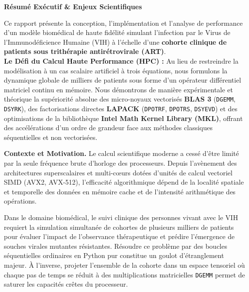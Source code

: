 \documentclass[11pt,a4paper]{report}
\theoremstyle{plain}
\theoremstyle{definition}
\theoremstyle{remark}
\begin{document}
\begin{tcolorbox}[colback=navyblue!90!black,colframe=navyblue!90!black,arc=2pt,coltext=white,boxrule=0pt]
\textbf{\large Résumé Exécutif \& Enjeux Scientifiques}
\end{tcolorbox}
\vspace{-0.3cm}
\begin{tcolorbox}[colback=blue!5!white,colframe=navyblue!80!black,arc=2pt,boxrule=0.8pt]
Ce rapport présente la conception, l'implémentation et l'analyse de performance d'un modèle biomédical de haute fidélité simulant l'infection par le Virus de l'Immunodéficience Humaine (VIH) à l'échelle d'une \textbf{cohorte clinique de patients sous trithérapie antirétrovirale (ART)}.\\
\textbf{Le Défi du Calcul Haute Performance (HPC) :} Au lieu de restreindre la modélisation à un cas scalaire artificiel à trois équations, nous formulons la dynamique globale de milliers de patients sous forme d'un opérateur différentiel matriciel continu en mémoire. Nous démontrons de manière expérimentale et théorique la supériorité absolue des micro-noyaux vectorisés \textbf{BLAS 3} (\texttt{DGEMM}, \texttt{DSYRK}), des factorisations directes \textbf{LAPACK} (\texttt{DPOTRF}, \texttt{DPOTRS}, \texttt{DSYEVD}) et des optimisations de la bibliothèque \textbf{Intel Math Kernel Library (MKL)}, offrant des accélérations d'un ordre de grandeur face aux méthodes classiques séquentielles et non vectorisées.
\end{tcolorbox}

\vspace{0.4cm}
\noindent\textbf{Contexte et Motivation.}
Le calcul scientifique moderne a cessé d'être limité par la seule fréquence brute d'horloge des processeurs. Depuis l'avènement des architectures superscalaires et multi-cœurs dotées d'unités de calcul vectoriel SIMD (AVX2, AVX-512), l'efficacité algorithmique dépend de la localité spatiale et temporelle des données en mémoire cache et de l'intensité arithmétique des opérations. 

Dans le domaine biomédical, le suivi clinique des personnes vivant avec le VIH requiert la simulation simultanée de cohortes de plusieurs milliers de patients pour évaluer l'impact de l'observance thérapeutique et prédire l'émergence de souches virales mutantes résistantes. Résoudre ce problème par des boucles séquentielles ordinaires en Python pur constitue un goulot d'étranglement majeur. À l'inverse, projeter l'ensemble de la cohorte dans un espace tensoriel où chaque pas de temps se réduit à des multiplications matricielles \texttt{DGEMM} permet de saturer les capacités crêtes du processeur.
\end{document}
